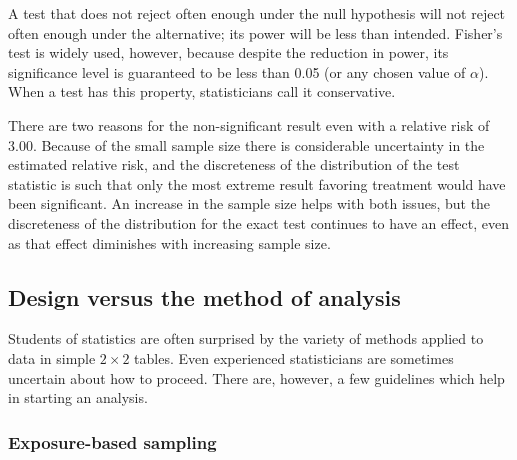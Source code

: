 	

A test that does not reject often enough under the null hypothesis will not reject often enough under the alternative; its power will be less than intended. Fisher's test is widely used, however, because despite the reduction in power, its significance level is guaranteed to be less than 0.05 (or any chosen value of $\alpha$).  When a test has this property, statisticians call it conservative.

There are two reasons for the non-significant result even with a relative risk of 3.00.  Because of the small sample size there is considerable uncertainty in the estimated relative risk, and the discreteness of the distribution of the test statistic is such that only the most extreme result favoring treatment would have been significant.  An increase in the sample size helps with both issues, but the discreteness of the distribution for the exact test continues to have an effect, even as that effect diminishes with increasing sample size.


\subsection{Design versus the method of analysis}
\label{designVsAnalysisBinaryData}

Students of statistics are often surprised by the variety of methods applied to data in simple $2 \times 2$ tables.  Even experienced statisticians are sometimes uncertain about how to proceed.  There are, however, a few guidelines which help in starting an analysis.


\subsubsection{Exposure-based sampling}

